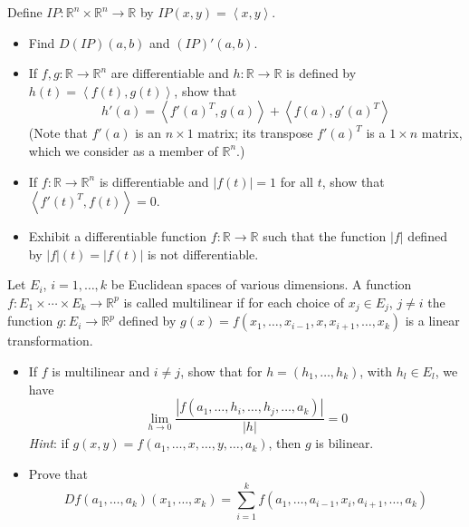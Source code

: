 \documentclass[12pt]{article}
\newenvironment{problem}[2][Problem]{\begin{trivlist}
\item[\hskip \labelsep {\bfseries #1}\hskip \labelsep {\bfseries #2.}]}{\end{trivlist}}
\begin{document}
\begin{problem}{2.13} 
Define $IP: \mathbb{R}^n\times \mathbb{R}^n \rightarrow \mathbb{R}$ by $IP\left(x,y\right) = \left\langle x,y\right\rangle$.
\begin{itemize}
	\item Find $D\left(IP\right)\left(a,b\right)$ and $\left(IP\right)'\left(a,b\right)$. 
	\item If $f,g:\mathbb{R}\rightarrow\mathbb{R}^n$ are differentiable and $h:\mathbb{R}\rightarrow \mathbb{R}$ is defined by $h\left(t\right) = \left\langle f\left(t\right),g\left(t\right)\right\rangle$, show that
	$$ h'\left(a\right) = \left\langle f'\left(a\right)^T, g\left(a\right) \right\rangle + \left\langle f\left(a\right), g'\left(a\right)^T \right\rangle $$ (Note that $f'\left(a\right)$ is an $n\times 1$ matrix; its transpose $f'\left(a\right)^T$ is a $1 \times n$ matrix, which we consider as a member of $\mathbb{R}^n$.)
	\item If $f:\mathbb{R}\rightarrow \mathbb{R}^n$ is differentiable and $\left|f\left(t\right)\right| = 1$ for all $t$, show that $\left\langle f'\left(t\right)^T, f\left(t\right)\right\rangle = 0$.
	\item Exhibit a differentiable function $f:\mathbb{R}\rightarrow \mathbb{R}$ such that the function $\left|f\right|$ defined by $\left|f\right|\left(t\right) = \left|f\left(t\right)\right|$ is not differentiable.
\end{itemize}
\end{problem}













\begin{problem}{2.14}
Let $E_i$, $i=1,\ldots,k$ be Euclidean spaces of various dimensions. A function $f: E_1 \times \cdots \times E_k \rightarrow \mathbb{R}^p$ is called multilinear if for each choice of $x_j\in E_j$, $j\neq i$ the function $g:E_i\rightarrow \mathbb{R}^p$ defined by $g\left(x\right) = f\left(x_1,\ldots,x_{i-1},x,x_{i+1},\ldots,x_k\right)$ is a linear transformation.
\begin{itemize}
	\item If $f$ is multilinear and $i\neq j$, show that for $h=\left(h_1,\ldots,h_k\right)$, with $h_l \in E_l$, we have
	$$ \lim_{h\rightarrow 0} \frac{\left| f\left(a_1,\ldots,h_i,\ldots, h_j,\ldots,a_k\right)\right|}{\left|h\right|} = 0$$ \textit{Hint}: if $g\left(x,y\right)=f\left(a_1,\ldots,x,\ldots,y,\ldots,a_k\right)$, then $g$ is bilinear. 
	\item Prove that 
	$$ Df\left(a_1,\ldots,a_k\right)\left(x_1,\ldots,x_k\right) = \sum_{i=1}^k f\left(a_1,\ldots, a_{i-1},x_i,a_{i+1},\ldots,a_k\right)$$
\end{itemize}
\end{problem}
\end{document}
